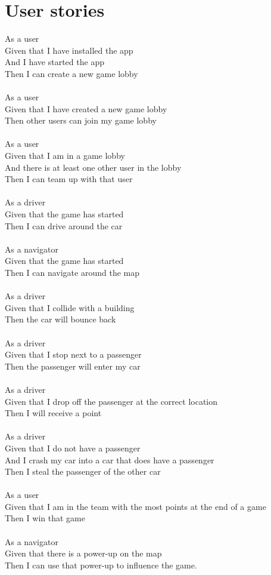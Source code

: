 \documentclass{article}
\begin{document}
\section{User stories}
As a user\\
Given that I have installed the app\\
And I have started the app\\
Then I can create a new game lobby\\\\
As a user\\
Given that I have created a new game lobby\\
Then other users can join my game lobby\\\\
As a  user\\
Given that I am in a game lobby\\
And there is at least one other user in the lobby\\
Then I can team up with that user\\\\
As a driver\\
Given that the game has started\\
Then I can drive around the car\\\\
As a navigator\\
Given that the game has started\\
Then I can navigate around the map\\\\
As a driver\\
Given that I collide with a building\\
Then the car will bounce back\\\\
As a driver\\
Given that I stop next to a passenger\\
Then the passenger will enter my car\\\\
As a driver\\
Given that I drop off the passenger at the correct location\\
Then I will receive a point\\\\
As a driver\\
Given that I do not have a passenger\\
And I crash my car into a car that does have a passenger\\
Then I steal the passenger of the other car\\\\
As a user\\
Given that I am in the team with the most points at the end of a game\\
Then I win that game\\\\
As a navigator\\
Given that there is a power-up on the map\\
Then I can use that power-up to influence the game.\\\\
\pagebreak
\end{document}
